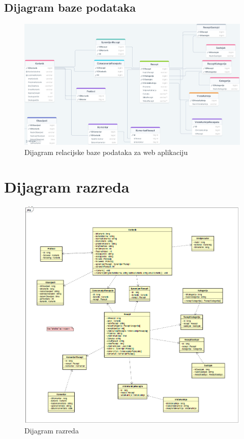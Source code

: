 \subsection{Dijagram baze podataka}
\begin{figure}[H]
	\includegraphics[width=\textwidth]{slike/CookBooked-dbp.png} %
	\centering
	\caption{Dijagram relacijske baze podataka za web aplikaciju}
	\label{fig:dijagrambp}
\end{figure}
\eject


\section{Dijagram razreda}

\begin{figure}[H]
	\includegraphics[width=\textwidth]{slike/DijagramRazreda.png} %
	\centering
	\caption{Dijagram razreda}
	\label{fig:dijagramraz}
\end{figure}

